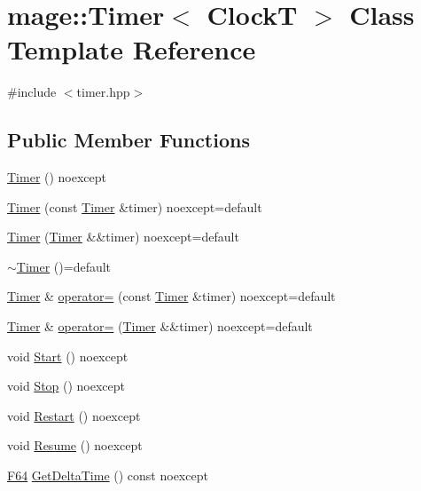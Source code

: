 \hypertarget{classmage_1_1_timer}{}\section{mage\+:\+:Timer$<$ ClockT $>$ Class Template Reference}
\label{classmage_1_1_timer}


{\ttfamily \#include $<$timer.\+hpp$>$}

\subsection*{Public Member Functions}
\begin{DoxyCompactItemize}
\item 
\mbox{\hyperlink{classmage_1_1_timer_afdc4024388d57bbdda74854ee8a11683}{Timer}} () noexcept
\item 
\mbox{\hyperlink{classmage_1_1_timer_a69aa4becb39ab40f378bd110db8ceb84}{Timer}} (const \mbox{\hyperlink{classmage_1_1_timer}{Timer}} \&timer) noexcept=default
\item 
\mbox{\hyperlink{classmage_1_1_timer_a7fb565cbe34c04df2713c43d3341cbc4}{Timer}} (\mbox{\hyperlink{classmage_1_1_timer}{Timer}} \&\&timer) noexcept=default
\item 
\mbox{\hyperlink{classmage_1_1_timer_a2802ae35dfdc05ff57b49e82f9b504f2}{$\sim$\+Timer}} ()=default
\item 
\mbox{\hyperlink{classmage_1_1_timer}{Timer}} \& \mbox{\hyperlink{classmage_1_1_timer_a2a8aefb272e02d8ba4a26058df80f119}{operator=}} (const \mbox{\hyperlink{classmage_1_1_timer}{Timer}} \&timer) noexcept=default
\item 
\mbox{\hyperlink{classmage_1_1_timer}{Timer}} \& \mbox{\hyperlink{classmage_1_1_timer_a39654f81efccc38a4cbe6164659407dd}{operator=}} (\mbox{\hyperlink{classmage_1_1_timer}{Timer}} \&\&timer) noexcept=default
\item 
void \mbox{\hyperlink{classmage_1_1_timer_a633908e9e816e9397cd93b65bc11ddb3}{Start}} () noexcept
\item 
void \mbox{\hyperlink{classmage_1_1_timer_ab9442d64c2c1bedec830004f292725ab}{Stop}} () noexcept
\item 
void \mbox{\hyperlink{classmage_1_1_timer_a54dab2d77f8beca30d52e8497e466988}{Restart}} () noexcept
\item 
void \mbox{\hyperlink{classmage_1_1_timer_a8464b2ea3fb3d97eac5ccb3a5b02e47b}{Resume}} () noexcept
\item 
\mbox{\hyperlink{namespacemage_ad26233bbec640deda836e572c1a23708}{F64}} \mbox{\hyperlink{classmage_1_1_timer_ad4e320f1abe821aa1c9596c4d8b9c7e9}{Get\+Delta\+Time}} () const noexcept

\end{DoxyCompactItemize}
